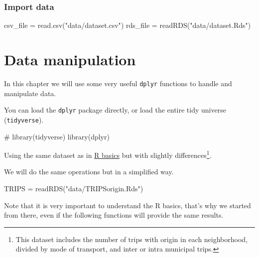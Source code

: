 \documentclass[
  letterpaper,
  DIV=11,
  numbers=noendperiod]{scrreprt}
\newenvironment{Shaded}{\begin{snugshade}}{\end{snugshade}}
\newcommand{\CommentTok}[1]{\textcolor[rgb]{0.37,0.37,0.37}{#1}}
\newcommand{\FunctionTok}[1]{\textcolor[rgb]{0.28,0.35,0.67}{#1}}
\newcommand{\NormalTok}[1]{\textcolor[rgb]{0.00,0.23,0.31}{#1}}
\newcommand{\OtherTok}[1]{\textcolor[rgb]{0.00,0.23,0.31}{#1}}
\newcommand{\StringTok}[1]{\textcolor[rgb]{0.13,0.47,0.30}{#1}}
\begin{document}
\subsection{Import data}\label{import-data}

\begin{Shaded}
\begin{Highlighting}[]
\NormalTok{csv\_file }\OtherTok{=} \FunctionTok{read.csv}\NormalTok{(}\StringTok{"data/dataset.csv"}\NormalTok{)}
\NormalTok{rds\_file }\OtherTok{=} \FunctionTok{readRDS}\NormalTok{(}\StringTok{"data/dataset.Rds"}\NormalTok{)}
\end{Highlighting}
\end{Shaded}

\chapter{Data manipulation}\label{data-manipulation}

In this chapter we will use some very useful \texttt{dplyr} functions to
handle and manipulate data.

You can load the \texttt{dplyr} package directly, or load the entire
tidy universe (\texttt{tidyverse}).

\begin{Shaded}
\begin{Highlighting}[]
\CommentTok{\# library(tidyverse)}
\FunctionTok{library}\NormalTok{(dplyr)}
\end{Highlighting}
\end{Shaded}

Using the same dataset as in
\href{https://u-shift.github.io/EITcourse/r-basics.html}{R basics} but
with slightly differences\footnote{This dataset includes the number of
  trips with origin in each neighborhood, divided by mode of transport,
  and inter or intra municipal trips.}.

We will do the same operations but in a simplified way.

\begin{Shaded}
\begin{Highlighting}[]
\NormalTok{TRIPS }\OtherTok{=} \FunctionTok{readRDS}\NormalTok{(}\StringTok{"data/TRIPSorigin.Rds"}\NormalTok{)}
\end{Highlighting}
\end{Shaded}

\begin{tcolorbox}[enhanced jigsaw, left=2mm, toprule=.15mm, toptitle=1mm, leftrule=.75mm, titlerule=0mm, colback=white, opacityback=0, opacitybacktitle=0.6, breakable, bottomtitle=1mm, colframe=quarto-callout-important-color-frame, colbacktitle=quarto-callout-important-color!10!white, arc=.35mm, rightrule=.15mm, bottomrule=.15mm, title=\textcolor{quarto-callout-important-color}{\faExclamation}\hspace{0.5em}{Important}, coltitle=black]

Note that it is very important to understand the R basics, that's why we
started from there, even if the following functions will provide the
same results.

\end{tcolorbox}
\end{document}
